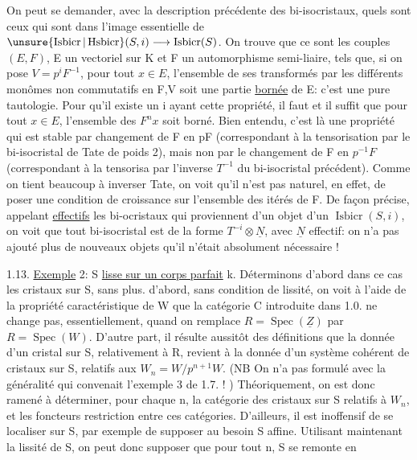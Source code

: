 On peut se demander, avec la description précédente des bi-isocristaux, quels sont ceux qui sont dans l'image essentielle de $\unsure{\operatorname{Isbicr}|\operatorname{Hsbicr}}(S,i)\longrightarrow\operatorname{Isbicr}(S)$. On trouve que ce sont les couples $(E,F)$, E un vectoriel sur K et F un automorphisme semi-liaire, tels que, si on pose $V=p^iF^{-1}$, pour tout $x\in E$, l'ensemble de ses transformés par les différents monômes non commutatifs en F,V soit une partie \uline{bornée} de E: c'est une pure tautologie. Pour qu'il existe un i ayant cette propriété, il faut et il suffit que pour tout $x\in E$, l'ensemble des $F^nx$ soit borné. Bien entendu, c'est là une propriété qui est stable par changement de F en pF (correspondant à la tensorisation par le bi-isocristal de Tate de poids 2), mais non par le changement de F en $p^{-1}F$ (correspondant à la tensorisa par l'inverse $T^{-1}$ du bi-isocristal précédent). Comme on tient beaucoup à inverser Tate, on voit qu'il n'est pas naturel, en effet, de poser une condition de croissance sur l'ensemble des  itérés de F. De façon précise, appelant \uline{effectifs} les bi-ocristaux qui proviennent d'un objet d'un $\operatorname{Isbicr}(S,i)$, on voit que tout bi-isocristal est de la forme $T^{-i}\otimes\underline N$, avec $\underline N$ effectif: on n'a pas ajouté plus de nouveaux objets qu'il n'était absolument nécessaire !

1.13. \uline{Exemple} 2: S \uline{lisse sur un corps parfait} k. Déterminons d'abord dans ce cas les cristaux sur S, sans plus.  d'abord, sans condition de lissité, on voit à l'aide de la propriété caractéristique de W que la catégorie C introduite dans 1.0. ne change pas, essentiellement, quand on remplace $R=\operatorname{Spec}(\underline Z)$ par $R=\operatorname{Spec}(W)$. D'autre part, il résulte aussitôt des définitions que la donnée d'un cristal sur S, relativement à R, revient à la donnée d'un système cohérent de cristaux sur S, relatifs aux $W_n=W/p^{n+1}W$. (NB On n'a pas formulé avec la généralité qui convenait l'exemple 3 de 1.7. ! ) Théoriquement, on est donc ramené à déterminer, pour chaque n, la catégorie des cristaux sur S relatifs à $W_n$, et les foncteurs restriction entre ces catégories. D'ailleurs, il est inoffensif de se localiser sur S,  par exemple de supposer au besoin S affine. Utilisant maintenant la lissité de S, on peut donc supposer que pour tout n, S se remonte en


